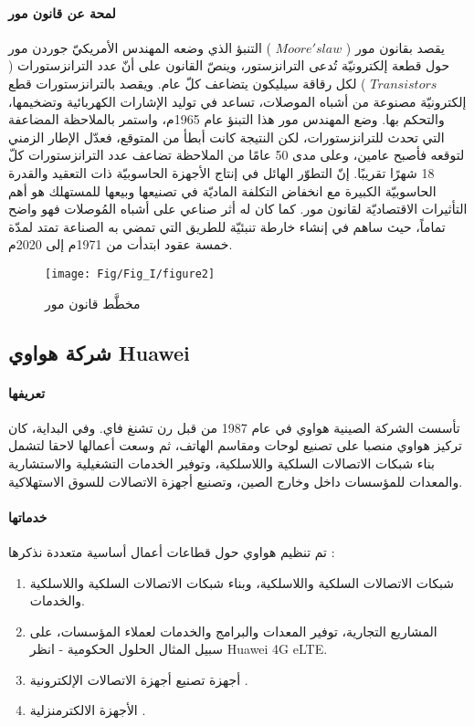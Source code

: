 \paragraph{لمحة عن قانون مور} 
يقصد بقانون مور ( $ Moore's law $ ) التنبؤ الذي وضعه المهندس الأمريكيّ جوردن مور حول قطعة إلكترونيّة تُدعى الترانزستور، وينصّ القانون على أنّ عدد الترانزستورات ( $  Transistors $ ) لكل رقاقة سيليكون يتضاعف كلّ عام. ويقصد بالترانزستورات قطع إلكترونيّة مصنوعة من أشباه الموصلات، تساعد في توليد الإشارات الكهربائية وتضخيمها، والتحكم بها. وضع المهندس مور هذا التبنؤ عام 1965م، واستمر بالملاحظة المضاعفة التي تحدث للترانزستورات، لكن النتيجة كانت أبطأ من المتوقع، فعدّل الإطار الزمني لتوقعه فأصبح عامين، وعلى مدى 50 عامًا من الملاحظة تضاعف عدد الترانزستورات كلّ 18 شهرًا تقريبًا.
إنّ التطوّر الهائل في إنتاج الأجهزة الحاسوبيّة ذات التعقيد والقدرة الحاسوبيّة الكبيرة مع انخفاض التكلفة الماديّة في تصنيعها وبيعها للمستهلك هو أهم التأثيرات الاقتصاديّة لقانون مور.
كما كان له أثر صناعي على أشباه المُوصلات فهو واضح تماماً، حيث ساهم في إنشاء خارطة تنبئيّة للطريق التي تمضي به الصناعة تمتد لمدّة خمسة عقود ابتدأت من 1971م إلى 2020م. 

\begin{figure}[h]
	\centering
	\texttt{[image: Fig/Fig\_I/figure2]}
	\caption{ مخطَّط قانون مور }
	\label{fig:figure2}
\end{figure}
\FloatBarrier

\subsection{ شركة هواوي Huawei }

\paragraph{تعريفها}
تأسست الشركة الصينية هواوي في عام 1987 من قبل رن تشنغ فاي. وفي البداية، كان تركيز هواوي منصبا على تصنيع لوحات ومقاسم الهاتف، ثم وسعت أعمالها لاحقا لتشمل بناء شبكات الاتصالات السلكية واللاسلكية، وتوفير الخدمات التشغيلية والاستشارية   والمعدات للمؤسسات داخل وخارج الصين، وتصنيع أجهزة الاتصالات للسوق الاستهلاكية. \cite{a10}

\paragraph{خدماتها}
تم تنظيم هواوي حول قطاعات أعمال أساسية متعددة نذكرها :
\begin{enumerate}
	\item
	شبكات الاتصالات السلكية واللاسلكية، وبناء شبكات الاتصالات السلكية واللاسلكية والخدمات.
	\item
	المشاريع التجارية، توفير المعدات والبرامج والخدمات لعملاء المؤسسات، على سبيل المثال الحلول الحكومية - انظر Huawei 4G eLTE.
	\item
	أجهزة تصنيع أجهزة الاتصالات الإلكترونية .
	\item
	الأجهزة الالكترمنزلية . \cite{a14}
\end{enumerate}
